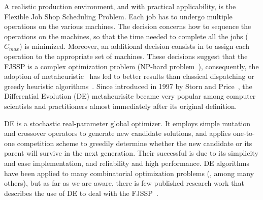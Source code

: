 \documentclass[runningheads,a4paper]{llncs}
\begin{document}
A realistic production environment, and with practical applicability, is the Flexible Job Shop Scheduling Problem. Each job has to undergo multiple operations on the various machines. The decision concerns how to sequence the operations on the machines, so that the time needed to complete all the jobs ($C_{max}$) is minimized. Moreover, an additional decision consists in to assign each operation to the appropriate set of machines. These decisions suggest that the FJSSP is a complex optimization problem (NP-hard problem~\cite{Garey:1976:CFJ:2782828.2782830}), %
consequently, the adoption of metaheuristic~\cite{Talbi,Luque:2013:PGA:2564896} has led to better results than classical dispatching or greedy heuristic algorithms~\cite{tang2011,Wang2012917,WANG2017}. %
Since introduced in 1997 by Storn and Price~\cite{Storn1997}, the Differential Evolution (DE) metaheurisitc became very popular among computer scientists and practitioners almost immediately after its original definition. 

DE is a stochastic real-parameter global optimizer. It employs simple mutation and crossover operators to generate new candidate solutions, and applies one-to-one competition scheme to greedily determine whether the new candidate or its parent will survive in the next generation. Their successful is due to its simplicity and ease implementation, and reliability and high performance. DE algorithms have been applied to many combinatorial optimization problems 
(\cite{%
Teoh:2015:DE-CVRP,GRECO20191,Hull:DE-StructuralOpt,Rout2010}, among many others), but as far as we are aware, there is few published research work that describes the use of DE to deal with the FJSSP~\cite{YUAN2013246}. 
\end{document}
